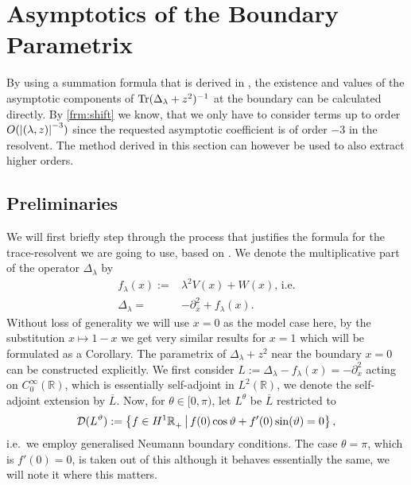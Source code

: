 \section{Asymptotics of the Boundary Parametrix}
By using a summation formula that is derived in \cite[2.2]{LV13}, the existence
and values of the asymptotic components of $\operatorname{Tr}(\Delta_\lambda + z^2)^{-1}$ at
the boundary can be calculated directly. By \cref{frm:shift} we know, that we
only have to consider terms up to order $O(\left|(\lambda,z)\right|^{-3})$ since the
requested asymptotic coefficient is of order $-3$ in the resolvent.  The method
derived in this section can however be used to also extract higher orders.

\subsection{Preliminaries}
We will first briefly step through the process that justifies the formula for
the trace-resolvent we are going to use, based on \cite{LV13}. We denote the
multiplicative part of the operator $\Delta_\lambda$ by 
\begin{equation}
  \label{def:f-lambda}
  \begin{split}
    f_\lambda(x) :={}& \lambda^2 V(x) + W(x)\text{, i.e.} \\
   \Delta_\lambda ={}& {-\partial_x^2} + f_\lambda(x).
  \end{split}
\end{equation}
Without loss of generality we will use $x = 0$ as the model case here, by the
substitution $x\mapsto 1-x$ we get very similar results for $x=1$ which will be
formulated as a Corollary. The parametrix of $\Delta_\lambda + z^2$ near the
boundary $x=0$ can be constructed explicitly. We first consider $L :=
\Delta_\lambda - f_\lambda(x) = -\partial_x^2$ acting on
$C_0^\infty(\mathbb{R})$, which is essentially self-adjoint in
$L^2(\mathbb{R})$, we denote the self-adjoint extension by $\overline L$. Now,
for $\theta \in [0,\pi)$, let $L^\theta$ be $\overline L$ restricted to
\begin{equation*}
  \mathcal{D}(L^\vartheta) := \left\{ f\in H^1{\mathbb{R}_+^{}}\, \middle|\, f(0)\cos\vartheta +
  f'(0)\sin(\vartheta) = 0\right\},
\end{equation*}
i.e.\ we employ generalised Neumann boundary conditions. The case $\theta =
\pi$, which is $f'(0) = 0$, is taken out of this although it behaves essentially
the same, we will note it where this matters.

